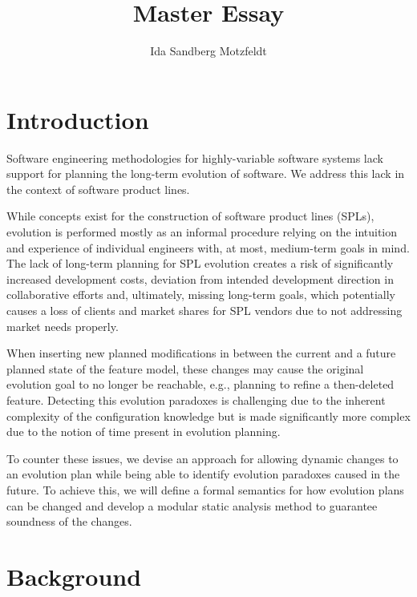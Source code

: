 \documentclass[a4paper,english]{ifimaster}
\title{Master Essay}
\author{Ida Sandberg Motzfeldt}
\begin{document}
\maketitle
\newpage

\frontmatter{}

\tableofcontents

\mainmatter{}

\chapter{Introduction}%
\label{cha:introduction}

Software engineering methodologies for highly-variable software systems lack support for planning the long-term evolution of software. We address this lack in the context of software product lines.

While concepts exist for the construction of software product lines (SPLs), evolution is performed mostly as an informal procedure relying on the intuition and experience of individual engineers with, at most, medium-term goals in mind. The lack of long-term planning for SPL evolution creates a risk of significantly increased development costs, deviation from intended development direction in collaborative efforts and, ultimately, missing long-term goals, which potentially causes a loss of clients and market shares for SPL vendors due to not addressing market needs properly.

When inserting new planned modifications in between the current and a future planned state of the feature model, these changes may cause the original evolution goal to no longer be reachable, e.g., planning to refine a then-deleted feature. Detecting this evolution paradoxes is challenging due to the inherent complexity of the configuration knowledge but is made significantly more complex due to the notion of time present in evolution planning.

To counter these issues, we devise an approach for allowing dynamic changes to an evolution plan while being able to identify evolution paradoxes caused in the future. To achieve this, we will define a formal semantics for how evolution plans can be changed and develop a modular static analysis method to guarantee soundness of the changes.

\chapter{Background}%
\label{cha:background}
\end{document}
